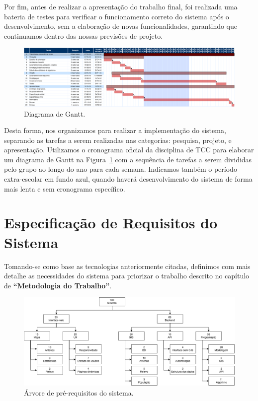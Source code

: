 \documentclass[]{politex}
\begin{document}
Por fim, antes de realizar a apresentação do trabalho final, foi realizada uma
bateria de testes para verificar o funcionamento correto do sistema após o
desenvolvimento, sem a elaboração de novas funcionalidades, garantindo que
continuamos dentro das nossas previsões de projeto.

\begin{figure}[H]
    \centering
    \includegraphics[width=6.5in]{imagens/diagrama_gantt}
    \caption{Diagrama de Gantt.}
    \label{fig:gantt}
\end{figure}

Desta forma, nos organizamos para realizar a implementação do sistema, separando
as tarefas a serem realizadas nas categorias: pesquisa, projeto, e apresentação.
Utilizamos o cronograma oficial da disciplina de TCC para elaborar um diagrama de Gantt na
Figura~\ref{fig:gantt} com a sequência de tarefas a serem divididas pelo grupo
ao longo do ano para cada semana. Indicamos também o período extra-escolar em
fundo azul, quando haverá desenvolvimento do sistema de forma mais lenta e
sem cronograma específico.

\chapter{Especificação de Requisitos do Sistema}

Tomando-se como base as tecnologias anteriormente citadas, definimos com mais
detalhe as necessidades do sistema para priorizar o trabalho descrito no
capítulo de \textbf{``Metodologia do Trabalho''}.

\begin{figure}[H]
    \centering
    \includegraphics[width=6in]{imagens/arvore_prerequisitos}
    \caption{Árvore de pré-requisitos do sistema.}
    \label{fig:arvore_prerequisitos}
\end{figure}
\end{document}
